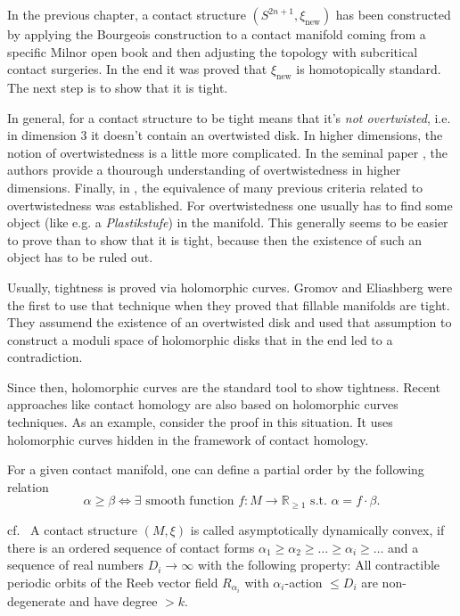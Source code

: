 In the previous chapter, a contact structure $(S^{2n+1}, \xi_\text{new})$ has been constructed by applying the Bourgeois construction
to a contact manifold coming from a specific Milnor open book and then adjusting the topology with subcritical contact surgeries.
In the end it was proved that $\xi_\text{new}$ is homotopically standard.
The next step is to show that it is tight. 

In general, for a contact structure to be tight means that it's \textit{not overtwisted}, i.e. in dimension 3 it doesn't contain an overtwisted disk.
In higher dimensions, the notion of overtwistedness is a little more complicated. 
In the seminal paper \cite{BEM15}, the authors provide a thourough understanding of overtwistedness in higher dimensions.
Finally, in \cite{CMP19}, the equivalence of many previous criteria related to overtwistedness was established.
For overtwistedness one usually has to find some object (like e.g. a \textit{Plastikstufe}) in the manifold.
This generally seems to be easier to prove than to show that it is tight, because then the existence of such an object has to be ruled out.

Usually, tightness is proved via holomorphic curves. Gromov and Eliashberg were the first to use that technique \cite{Gromov85,Eliashberg91}
when they proved that fillable manifolds are tight. They assumend the existence of an overtwisted disk and used that assumption to construct
a moduli space of holomorphic disks that in the end led to a contradiction.

Since then, holomorphic curves are the standard tool to show tightness.
Recent approaches like contact homology are also based on holomorphic curves techniques.
As an example, consider the proof in this situation. It uses holomorphic curves hidden in the framework of contact homology.

For a given contact manifold, one can define a partial order by the following relation
\[
    \alpha \geq \beta \Leftrightarrow \exists \text{ smooth function } f: M \to \mathbb R_{\geq 1} \text{ s.t. } \alpha = f \cdot \beta.
\]
\begin{definition}[k-ADC]cf.~\cite[Definition 2.5]{BGMZ22}
    A contact structure $(M, \xi)$ is called asymptotically dynamically convex, if there is an ordered sequence of contact forms 
    $\alpha_1 \geq \alpha_2 \geq \dots \geq \alpha_i \geq \dots$ and a sequence of real numbers $D_i \to \infty$
    with the following property:
    All contractible periodic orbits of the Reeb vector field $R_{\alpha_i}$ with $\alpha_i$-action $\leq D_i$ are non-degenerate
    and have degree $> k$.
\end{definition}

